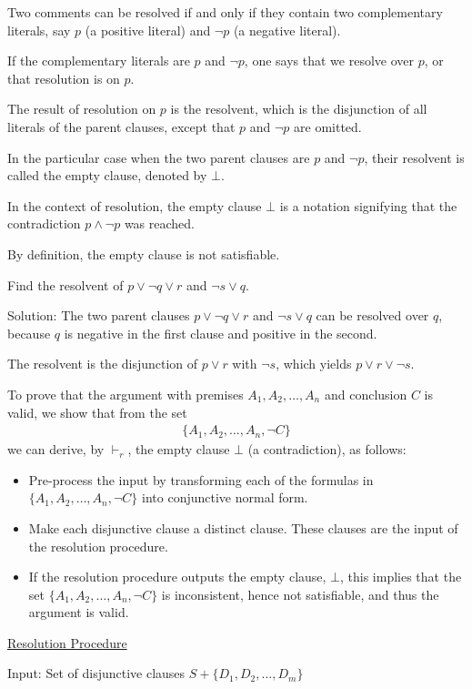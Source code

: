 \documentclass{article}
\begin{document}
Two comments can be resolved if and only if they contain two complementary literals, say $p$ (a positive literal) and $\neg p$ (a negative literal).

If the complementary literals are $p$ and $\neg p$, one says that we resolve over $p$, or that resolution is on $p$.

The result of resolution on $p$ is the resolvent, which is the disjunction of all literals of the parent clauses, except that $p$ and $\neg p$ are omitted.

In the particular case when the two parent clauses are $p$ and $\neg p$, their resolvent is called the empty clause, denoted by $\bot$.

In the context of resolution, the empty clause $\bot$ is a notation signifying that the contradiction $p \wedge \neg p$ was reached.

By definition, the empty clause is not satisfiable.

Find the resolvent of $p \vee \neg q \vee r$ and $\neg s \vee q$.

Solution: The two parent clauses $p \vee \neg q \vee r$ and $\neg s \vee q$ can be resolved over $q$, because $q$ is negative in the first clause and positive in the second.

The resolvent is the disjunction of $p \vee r$ with $\neg s$, which yields $p \vee r \vee \neg s$.

To prove that the argument with premises $A_1, A_2, \ldots, A_n$ and conclusion $C$ is valid, we show that from the set
\begin{align*}
\{A_1,A_2,\ldots,A_n,\neg C\}
\end{align*}
we can derive, by $\vdash_r$, the empty clause $\bot$ (a contradiction), as follows:
\begin{itemize}
    \item Pre-process the input by transforming each of the formulas in $\{A_1,A_2,\ldots,A_n,\neg C\}$ into conjunctive normal form.
    \item Make each disjunctive clause a distinct clause. These clauses are the input of the resolution procedure.
    \item If the resolution procedure outputs the empty clause, $\bot$, this implies that the set $\{A_1,A_2,\ldots,A_n,\neg C\}$ is inconsistent, hence not satisfiable, and thus the argument is valid.
\end{itemize}

\underline{Resolution Procedure}

Input: Set of disjunctive clauses $S + \{D_1,D_2, \ldots, D_m\}$
\end{document}
